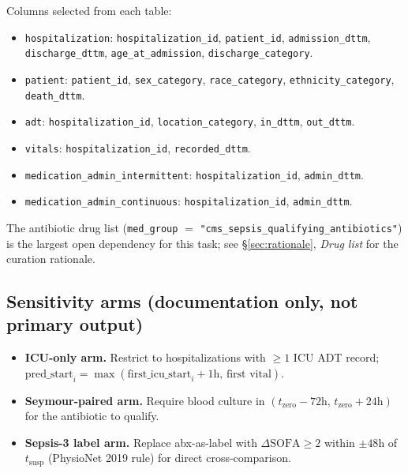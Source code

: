 \documentclass[11pt]{article}
\newcommand{\tzero}{t_{\text{zero}}}
\newcommand{\predstart}{\text{pred\_start}}
\begin{document}
Columns selected from each table:
\begin{itemize}[leftmargin=2em, itemsep=0pt]
  \item \texttt{hospitalization}: \texttt{hospitalization\_id},
        \texttt{patient\_id}, \texttt{admission\_dttm},
        \texttt{discharge\_dttm}, \texttt{age\_at\_admission},
        \texttt{discharge\_category}.
  \item \texttt{patient}: \texttt{patient\_id},
        \texttt{sex\_category}, \texttt{race\_category},
        \texttt{ethnicity\_category}, \texttt{death\_dttm}.
  \item \texttt{adt}: \texttt{hospitalization\_id},
        \texttt{location\_category}, \texttt{in\_dttm},
        \texttt{out\_dttm}.
  \item \texttt{vitals}: \texttt{hospitalization\_id},
        \texttt{recorded\_dttm}.
  \item \texttt{medication\_admin\_intermittent}:
        \texttt{hospitalization\_id}, \texttt{admin\_dttm}.
  \item \texttt{medication\_admin\_continuous}:
        \texttt{hospitalization\_id}, \texttt{admin\_dttm}.
\end{itemize}

The antibiotic drug list (\texttt{med\_group} $=$
\texttt{"cms\_sepsis\_qualifying\_antibiotics"}) is the largest open
dependency for this task; see \S\ref{sec:rationale}, \emph{Drug list}
for the curation rationale.

\subsection{Sensitivity arms (documentation only, not primary output)}

\begin{itemize}[leftmargin=2em]
  \item \textbf{ICU-only arm.} Restrict to hospitalizations with
        $\ge 1$ ICU ADT record;
        $\predstart_i = \max(\text{first\_icu\_start}_i + 1\text{h},\,
        \text{first vital})$.
  \item \textbf{Seymour-paired arm.} Require blood culture in
        $(\tzero - 72\text{h},\, \tzero + 24\text{h})$ for the
        antibiotic to qualify.
  \item \textbf{Sepsis-3 label arm.} Replace abx-as-label with
        $\Delta\text{SOFA}\ge 2$ within $\pm 48$h of $t_{\text{susp}}$
        (PhysioNet 2019 rule) for direct cross-comparison.
\end{itemize}
\end{document}
